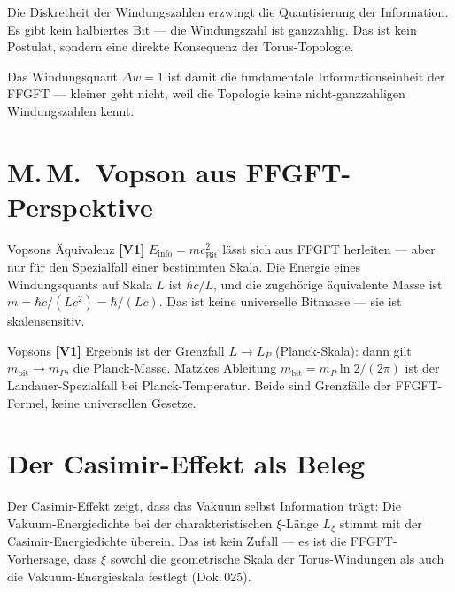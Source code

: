 Die Diskretheit der Windungszahlen erzwingt die Quantisierung der
Information. Es gibt kein halbiertes Bit --- die Windungszahl ist ganzzahlig.
Das ist kein Postulat, sondern eine direkte Konsequenz der Torus-Topologie.

Das Windungsquant $\Delta w = 1$ ist damit die fundamentale
Informationseinheit der FFGFT --- kleiner geht nicht, weil die Topologie keine
nicht-ganzzahligen Windungszahlen kennt.

\section{M.\,M.~Vopson aus FFGFT-Perspektive}

Vopsons Äquivalenz \textbf{[V1]} $E_{\text{info}} = mc^2_{\text{Bit}}$ lässt sich
aus FFGFT herleiten --- aber nur für den Spezialfall einer bestimmten Skala.
Die Energie eines Windungsquants auf Skala $L$ ist $\hbar c / L$, und die
zugehörige äquivalente Masse ist $m = \hbar c / (Lc^2) = \hbar / (Lc)$.
Das ist keine universelle Bitmasse --- sie ist skalensensitiv.

Vopsons \textbf{[V1]} Ergebnis ist der Grenzfall $L \to L_P$ (Planck-Skala):
dann gilt $m_{\text{bit}} \to m_P$, die Planck-Masse. Matzkes Ableitung
$m_{\text{bit}} = m_P \ln 2 / (2\pi)$ ist der Landauer-Spezialfall bei
Planck-Temperatur. Beide sind Grenzfälle der FFGFT-Formel, keine
universellen Gesetze.

\section{Der Casimir-Effekt als Beleg}

Der Casimir-Effekt zeigt, dass das Vakuum selbst Information trägt:
Die Vakuum-Energiedichte bei der charakteristischen $\xi$-Länge $L_\xi$
stimmt mit der Casimir-Energiedichte überein. Das ist kein Zufall ---
es ist die FFGFT-Vorhersage, dass $\xi$ sowohl die geometrische Skala
der Torus-Windungen als auch die Vakuum-Energieskala festlegt (Dok.\,025).
